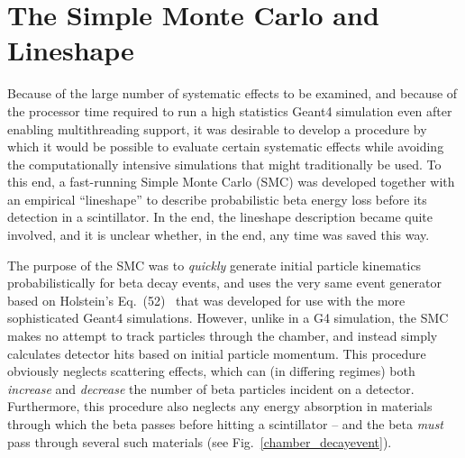 


\section{The Simple Monte Carlo and Lineshape}
\label{sec:lineshape}
Because of the large number of systematic effects to be examined, and because of the processor time required to run a high statistics Geant4 simulation even after enabling multithreading support, it was desirable to develop a procedure by which it would be possible to evaluate certain systematic effects while avoiding the computationally intensive simulations that might traditionally be used.  To this end, a fast-running Simple Monte Carlo (SMC) was developed together with an empirical ``lineshape'' to describe probabilistic beta energy loss before its detection in a scintillator.  In the end, the lineshape description became quite involved, and it is unclear whether, in the end, any time was saved this way. 

The purpose of the SMC was to \emph{quickly} generate initial particle kinematics probabilistically for beta decay events, and uses the very same event generator based on Holstein's Eq.~(52)~\cite{holstein} that was developed for use with the more sophisticated Geant4 simulations.  However, unlike in a G4 simulation, the SMC makes no attempt to track particles through the chamber, and instead simply calculates detector hits based on initial particle momentum.  This procedure obviously neglects scattering effects, which can (in differing regimes) both \emph{increase} and \emph{decrease} the number of beta particles incident on a detector.  Furthermore, this procedure also neglects any energy absorption in materials through which the beta passes before hitting a scintillator -- and the beta \emph{must} pass through several such materials (see Fig.~\ref{chamber_decayevent}).


